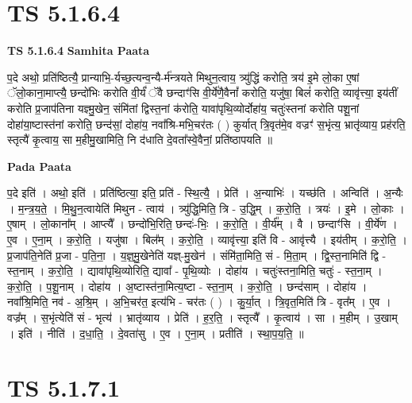 \documentclass[17pt]{extarticle}
\begin{document}
\section{ TS 5.1.6.4 }

\textbf{TS 5.1.6.4 } \newline
\textbf{Samhita Paata} \newline

प॒दे अथो॒ प्रति॑ष्ठित्यै॒ प्रान्याभि॒-र्यच्छ॒त्यन्व॒न्यै-र्म॑न्त्रयते मिथुन॒त्वाय॒ त्र्यु॑द्धिं करोति॒ त्रय॑ इ॒मे लो॒का ए॒षां ॅलो॒काना॒माप्त्यै॒ छन्दो॑भिः करोति वी॒र्यं॑ ॅवै छन्दाꣳ॑सि वी॒र्ये॑णै॒वैनां᳚ करोति॒ यजु॑षा॒ बिलं॑ करोति॒ व्यावृ॑त्त्या॒ इय॑तीं करोति प्र॒जाप॑तिना यज्ञ्मु॒खेन॒ संमि॑तां द्विस्त॒नां क॑रोति॒ यावा॑पृथि॒व्योर्दोहा॑य॒ चतुः॑स्तनां करोति पशू॒नां दोहा॑या॒ष्टास्त॑नां करोति॒ छन्द॑सां॒ दोहा॑य॒ नवा᳚श्रि-मभि॒चर॑तः ( ) कुर्यात् त्रि॒वृत॑मे॒व वज्रꣳ॑ स॒भृंत्य॒ भ्रातृ॑व्याय॒ प्रह॑रति॒ स्तृत्यै॑ कृ॒त्वाय॒ सा म॒हीमु॒खामिति॒ नि द॑धाति दे॒वता᳚स्वे॒वैनां॒ प्रति॑ष्ठापयति ॥ \newline

\textbf{Pada Paata} \newline

प॒दे इति॑ । अथो॒ इति॑ । प्रति॑ष्ठित्या॒ इति॒ प्रति॑ - स्थि॒त्यै॒ । प्रेति॑ । अ॒न्याभिः॑ । यच्छ॑ति । अन्विति॑ । अ॒न्यैः । म॒न्त्र॒य॒ते॒ । मि॒थु॒न॒त्वायेति॑ मिथुन - त्वाय॑ । त्र्यु॑द्धि॒मिति॒ त्रि - उ॒द्धि॒म् । क॒रो॒ति॒ । त्रयः॑ । इ॒मे । लो॒काः । ए॒षाम् । लो॒काना᳚म् । आप्त्यै᳚ । छन्दो॑भि॒रिति॒ छन्दः॑-भिः॒ । क॒रो॒ति॒ । वी॒र्य᳚म् । वै । छन्दाꣳ॑सि । वी॒र्ये॑ण । ए॒व । ए॒ना॒म् । क॒रो॒ति॒ । यजु॑षा । बिल᳚म् । क॒रो॒ति॒ । व्यावृ॑त्त्या॒ इति॑ वि - आवृ॑त्त्यै । इय॑तीम् । क॒रो॒ति॒ । प्र॒जाप॑ति॒नेति॑ प्र॒जा - प॒ति॒ना॒ । य॒ज्ञ्॒मु॒खेनेति॑ यज्ञ्-मु॒खेन॑ । संमि॑ता॒मिति॒ सं - मि॒ता॒म् । द्वि॒स्त॒नामिति॑ द्वि - स्त॒नाम् । क॒रो॒ति॒ । द्यावा॑पृथि॒व्योरिति॒ द्यावा᳚ - पृ॒थि॒व्योः । दोहा॑य । चतुः॑स्तना॒मिति॒ चतुः॑ - स्त॒ना॒म् । क॒रो॒ति॒ । प॒शू॒नाम् । दोहा॑य । अ॒ष्टास्त॑ना॒मित्य॒ष्टा - स्त॒ना॒म् । क॒रो॒ति॒ । छन्द॑साम् । दोहा॑य । नवा᳚श्रि॒मिति॒ नव॑ - अ॒श्रि॒म् । अ॒भि॒चर॑त॒ इत्य॑भि - चर॑तः ( ) । कु॒र्या॒त् । त्रि॒वृत॒मिति॑ त्रि - वृत᳚म् । ए॒व । वज्र᳚म् । स॒भृंत्येति॑ सं - भृत्य॑ । भ्रातृ॑व्याय । प्रेति॑ । ह॒र॒ति॒ । स्तृत्यै᳚ । कृ॒त्वाय॑ । सा । म॒हीम् । उ॒खाम् । इति॑ । नीति॑ । द॒धा॒ति॒ । दे॒वता॑सु । ए॒व । ए॒ना॒म् । प्रतीति॑ । स्था॒प॒य॒ति॒ ॥  \newline





\section{ TS 5.1.7.1 }
\end{document}
